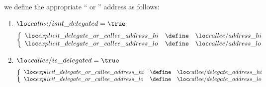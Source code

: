 \item[\underline{Defining the address of the first \delegateName{} / \calleeName{} account-row $n^°(i + \callFirstDelegateOrCalleeAccountRowOffset)$:}]
	we define the appropriate ``\delegateName{} or \calleeName{}'' address as follows:
	\begin{enumerate}
		\item
			\If   $\locCalleeIsntDelegated = \true$
			\[
				\left\{ \begin{array}{lcl}
					\locExplicitDelegateOrCalleeAddressHi & \define & \locCalleeAddressHi \\
					\locExplicitDelegateOrCalleeAddressLo & \define & \locCalleeAddressLo \\
				\end{array} \right.
			\]
		\item
			\If   $\locCalleeIsDelegated = \true$
			\Then
			\[
				\left\{ \begin{array}{lcl}
					\locExplicitDelegateOrCalleeAddressHi & \define & \locCalleeDelegateAddressHi \\
					\locExplicitDelegateOrCalleeAddressLo & \define & \locCalleeDelegateAddressLo \\
				\end{array} \right.
			\]
	\end{enumerate}

